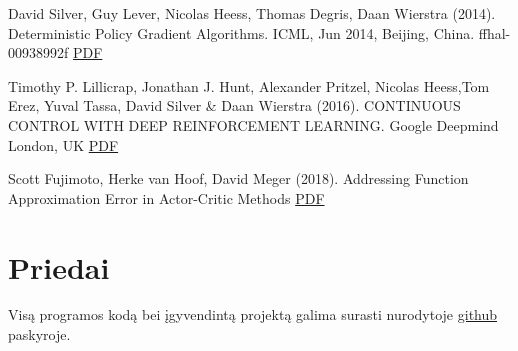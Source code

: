 \documentclass[a4paper, 12pt]{article}
\begin{document}
\begin{thebibliography}{99}
David Silver, Guy Lever, Nicolas Heess, Thomas Degris, Daan Wierstra (2014). Deterministic Policy
Gradient Algorithms. ICML, Jun 2014, Beijing, China. ffhal-00938992f \href{https://hal.inria.fr/file/index/docid/938992/filename/dpg-icml2014.pdf}{PDF}

Timothy P. Lillicrap, Jonathan J. Hunt, Alexander Pritzel, Nicolas Heess,Tom Erez, Yuval Tassa, David Silver \& Daan Wierstra (2016). CONTINUOUS CONTROL WITH DEEP REINFORCEMENT LEARNING. Google Deepmind London, UK
\href{https://arxiv.org/pdf/1509.02971.pdf}{PDF}

Scott Fujimoto, Herke van Hoof, David Meger (2018). Addressing Function Approximation Error in Actor-Critic Methods
\href{https://arxiv.org/pdf/1802.09477.pdf}{PDF}





\end{thebibliography}
%
%
\newpage
\appendix
\section{Priedai}

Visą programos kodą bei įgyvendintą projektą galima surasti nurodytoje \href{https://github.com/PaulJanen/RF-Learning}{github} paskyroje.

\boldmath
\printnoidxglossaries

\end{document}

